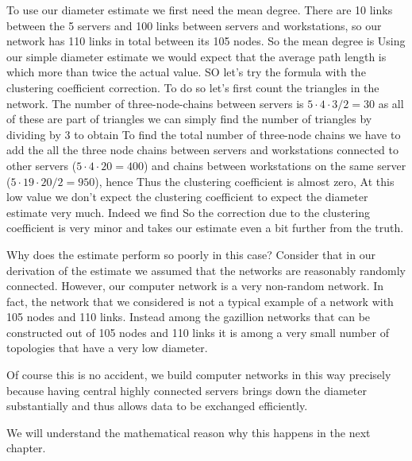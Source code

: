 To use our diameter estimate we first need the mean degree. There are 10 links between the 5 servers and 100 links between servers and workstations, so our network has 110 links in total between its 105 nodes. So the mean degree is 
Using our simple diameter estimate we would expect that the average path length is 
which more than twice the actual value. SO let's try the formula with the clustering coefficient correction. To do so let's first count the triangles in the network. The number of three-node-chains between servers is $5\cdot 4 \cdot 3 / 2 = 30$ as all of these are part of triangles we can simply find the number of triangles by dividing by 3 to obtain 
To find the total number of three-node chains we have to add the all the three node chains between servers and workstations connected to other servers ($5\cdot 4 \cdot 20=400$) and chains between workstations on the same server ($5 \cdot 19 \cdot 20/2=950$), hence 
Thus the clustering coefficient is almost zero, 
At this low value we don't expect the clustering coefficient to expect the diameter estimate very much. Indeed we find 
\eq{
D_{\rm Est2}=\log_{(1-c)z ((1-c)N)} \approx log_{2.05}(103) ]approx 6.46
}
So the correction due to the clustering coefficient is very minor and takes our estimate even a bit further from the truth. 

Why does the estimate perform so poorly in this case? Consider that in our derivation of the estimate we assumed that the networks are reasonably randomly connected. However, our computer network is a very non-random network. In fact, the network that we considered is not a typical example of a network with 105 nodes and 110 links. Instead among the gazillion networks that can be constructed out of 105 nodes and 110 links it is among a very small number of topologies that have a very low diameter. 

Of course this is no accident, we build computer networks in this way precisely because having central highly connected servers brings down the diameter substantially and thus allows data to be exchanged efficiently. 

We will understand the mathematical reason why this happens in the next chapter. 
